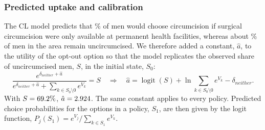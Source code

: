 \documentclass[11pt]{article}
\numberwithin{equation}{section}\numberwithin{figure}{section}\numberwithin{table}{section}
\begin{document}
\begin{table}[!htbp]
\centering
\caption{Service options available in each policy (the opt-out option is always available).}\label{tab:policies}
\small
{}
\end{table}

\subsubsection{Predicted uptake and calibration}
The CL model predicts that \mmcuncalUptake\% of men would choose circumcision if surgical circumcision were only available at permanent health facilities, whereas about \mmcoptoutShare\% of men in the area remain uncircumcised. We therefore added a constant, $\hat{a}$, to the utility of the opt-out option so that the model replicates the observed share of uncircumcised men, $S$, in the initial state, $S_0$:
\begin{equation}\label{eq:calibration}
\frac{e^{\delta_{neither} + \hat{a}}}{e^{\delta_{neither} + \hat{a}} + \sum_{k \in S_0 \setminus 0} e^{V_k}} = S
\quad\Longrightarrow\quad
\hat{a} = \operatorname{logit}(S) + \ln \sum_{k \in S_0 \setminus 0} e^{V_k} - \delta_{neither}.
\end{equation}
With $S = 69.2\%$, $\hat{a} = 2.924$. The same constant applies to every policy. Predicted choice probabilities for the options in a policy, $S_1$, are then given by the logit function, $P_j(S_1) = e^{V_j}/\sum_{k \in S_1} e^{V_k}$.
\end{document}
